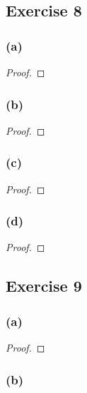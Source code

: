 \documentclass[14pt]{extarticle}
\begin{document}
\subsection{Exercise 8}

\subsubsection{(a)}

\begin{proof}

\end{proof}

\subsubsection{(b)}

\begin{proof}

\end{proof}

\subsubsection{(c)}

\begin{proof}

\end{proof}

\subsubsection{(d)}

\begin{proof}

\end{proof}

\subsection{Exercise 9}

\subsubsection{(a)}

\begin{proof}

\end{proof}

\subsubsection{(b)}
\end{document}
